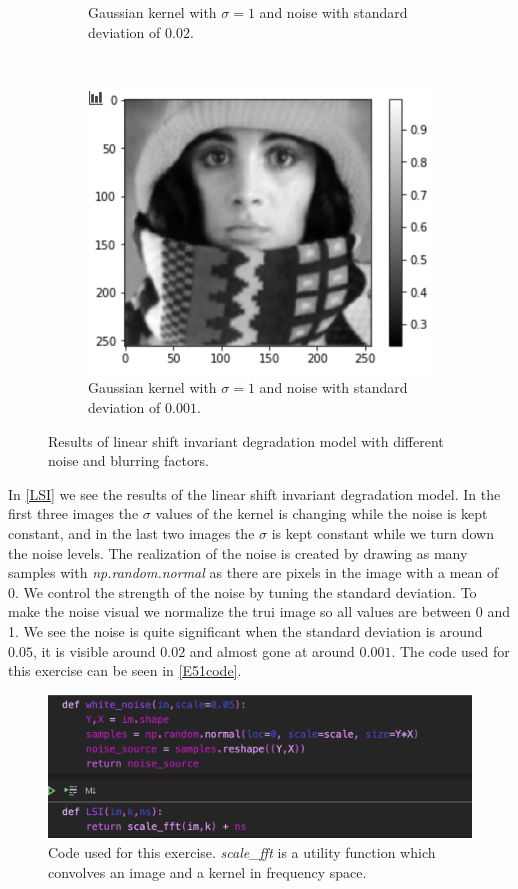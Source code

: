 \begin{figure}[H]
\begin{subfigure}[b]{0.45\linewidth}
		\caption{Gaussian kernel with $\sigma = 1$ and noise with standard deviation of $0.02$.}
	\end{subfigure}
	\\
	\begin{subfigure}[b]{0.45\linewidth}
		\centering
		\includegraphics[width=\linewidth]{Materials/E5/gaus1std0001}
		\caption{Gaussian kernel with $\sigma = 1$ and noise with standard deviation of $0.001$.}
	\end{subfigure}
	\caption{Results of linear shift invariant degradation model with different noise and blurring factors.}
	\label{LSI}
\end{figure}
In \autoref{LSI} we see the results of the linear shift invariant degradation model. In the first three images the $\sigma$ values of the kernel is changing while the noise is kept constant, and in the last two images the $\sigma$ is kept constant while we turn down the noise levels. The realization of the noise is created by drawing as many samples with \textit{np.random.normal} as there are pixels in the image with a mean of 0. We control the strength of the noise by tuning the standard deviation. To make the noise visual we normalize the trui image so all values are between 0 and 1. We see the noise is quite significant when the standard deviation is around $0.05$, it is visible around $0.02$ and almost gone at around $0.001$. The code used for this exercise can be seen in \autoref{E51code}.
\begin{figure}[H]
	\centering
	\includegraphics[width=0.8\linewidth]{Materials/E5/E51code}
	\caption{Code used for this exercise. \textit{scale\_fft} is a utility function which convolves an image and a kernel in frequency space.}
	\label{E51code}
\end{figure}

